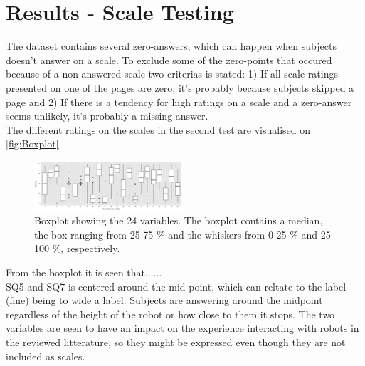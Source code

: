 \section{{\color{red}Results - Scale Testing}}
\label{ResultsScaleTesting}
%
The dataset contains several zero-answers, which can happen when subjects doesn't answer on a scale. To exclude some of the zero-points that occured because of a non-answered scale two criterias is stated: 1) If all scale ratings presented on one of the pages are zero, it's probably because subjects skipped a page and 2) If there is a tendency for high ratings on a scale and a zero-answer seems unlikely, it's probably a missing answer.\\

\noindent
The different ratings on the scales in the second test are visualised on \autoref{fig:Boxplot}.
%
\begin{figure}[H]
\centering
\includegraphics[width = 0.49\textwidth]{Figure/Boksplot0er}
\setlength{} 
\caption{Boxplot showing the 24 variables. The boxplot contains a median, the box ranging from 25-75 \% and the whiskers from 0-25 \% and 25-100 \%, respectively.}
\label{fig:Boxplot}
\end{figure}
\noindent
%
From the boxplot it is seen that......\\
 
\noindent
SQ5 and SQ7 is centered around the mid point, which can reltate to the label (fine) being to wide a label. Subjects are answering around the midpoint regardless of the height of the robot or how close to them it stops. The two variables are seen to have an impact on the experience interacting with robots in the reviewed litterature, so they might be expressed even though they are not included as scales.

